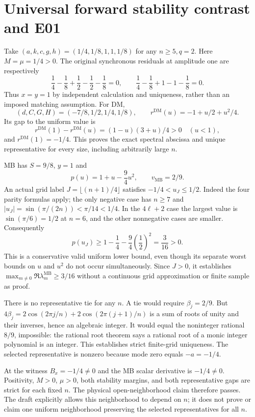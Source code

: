 \documentclass[11pt]{article}
\newcommand{\DM}{\mathrm{DM}}
\newcommand{\MB}{\mathrm{MB}}
\begin{document}
\section{Universal forward stability contrast and E01}
Take $(a,k,c,g,h)=(1/4,1/8,1,1,1/8)$ for any $n\ge5,q=2$.
Here $M=\mu=1/4>0$. The original synchronous residuals at amplitude
one are respectively
\[
 \frac14-\frac18+\frac12-\frac12-\frac18=0,
 \qquad\frac14-\frac18+1-1-\frac18=0.
\]
Thus $x=y=1$ by independent calculation and uniqueness, rather than
an imposed matching assumption. For DM,
\[
 (d,C,G,H)=(-7/8,1/2,1/4,1/8),\qquad
 r^{\DM}(u)=-1+u/2+u^2/4.
\]
Its gap to the uniform value is
\[
 r^{\DM}(1)-r^{\DM}(u)=(1-u)(3+u)/4>0\quad(u<1),
\]
and $r^{\DM}(1)=-1/4$. This proves the exact spectral abscissa
and unique representative for every size, including arbitrarily large $n$.

MB has $S=9/8$, $y=1$ and
\[
 p(u)=1+u-\frac94u^2,\qquad v_{\MB}=2/9.
\]
An actual grid label $J=\lfloor(n+1)/4\rfloor$ satisfies
$-1/4<u_J\le1/2$. Indeed the four parity formulas apply; the only
negative case has $n\ge7$ and
$|u_J|=\sin(\pi/(2n))<\pi/14<1/4$. In the $4\ell+2$ case
the largest value is $\sin(\pi/6)=1/2$ at $n=6$, and the other
nonnegative cases are smaller. Consequently
\[
 p(u_J)\ge1-\frac14-\frac94\left(\frac12\right)^2
          =\frac3{16}>0.
\]
This is a conservative valid uniform lower bound, even though its
separate worst bounds on $u$ and $u^2$ do not occur simultaneously.
Since $J>0$, it establishes
$\max_{m\ne0}\Re\lambda_m^{\MB}\ge3/16$ without a continuous
grid approximation or finite sample as proof.

There is no representative tie for any $n$. A tie would require
$\beta_j=2/9$. But
$4\beta_j=2\cos(2\pi j/n)+2\cos(2\pi(j+1)/n)$ is a sum of
roots of unity and their inverses, hence an algebraic integer. It
would equal the noninteger rational $8/9$, impossible: the rational
root theorem says a rational root of a monic integer polynomial is an
integer. This establishes strict finite-grid uniqueness. The selected
representative is nonzero because mode zero equals $-a=-1/4$.

At the witness $B_x=-1/4\ne0$ and the MB scalar derivative is
$-1/4\ne0$. Positivity, $M>0$, $\mu>0$, both stability margins, and
both representative gaps are strict for each fixed $n$. The physical
open-neighborhood claim therefore passes. The draft explicitly allows
this neighborhood to depend on $n$; it does not prove or claim one
uniform neighborhood preserving the selected representatives for all $n$.
\end{document}
